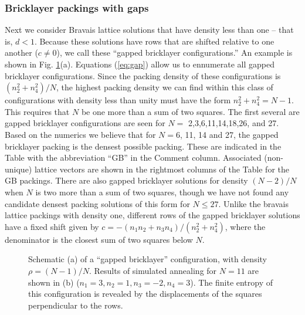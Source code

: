 \documentclass[aps]{revtex4}
\begin{document}
\subsubsection{Bricklayer packings with gaps}
\label{sec:bricklayer}
Next we consider Bravais lattice solutions that have density less than one -- that is, $d < 1$.  Because these solutions have rows that are shifted relative to one another ($c\neq 0$), we call these ``gapped bricklayer configurations.''  An example is shown in Fig. \ref{fig:gb}(a).  Equations (\ref{eq:gap}) allow us to ennumerate all gapped bricklayer configurations. Since the packing density of these configurations is $(n_2^2 + n_4^2)/N$, the highest packing density we can find within this class of configurations with density less than unity must have the form $n_2^2 + n_4^2 = N-1$.  This requires that $N$ be one more than a sum of two squares. The first several are gapped bricklayer configurations are seen for $N=$ 2,3,6,11,14,18,26, and 27.  Based on the numerics we believe that for $N=6$, 11, 14 and 27, the gapped bricklayer packing is the densest possible packing. These are indicated in the Table with the abbreviation ``GB'' in the Comment column. Associated (non-unique) lattice vectors are shown in the rightmost columns of the Table for the GB packings.  There are also gapped bricklayer solutions for density $(N-2)/N$ when $N$ is two more than a sum of two squares, though we have not found any candidate densest packing solutions of this form for $N \leq 27$. Unlike the bravais lattice packings with density one, different rows of the gapped bricklayer solutions have a fixed shift given by $c = - (n_1 n_2 + n_3 n_4)/(n_2^2 + n_4^2)$, where the denominator is the closest sum of two squares below $N$. 

\begin{figure}[H]
\caption{\label{fig:gb}Schematic (a) of a ``gapped bricklayer'' configuration, with density $\rho = (N-1)/N$. Results of simulated annealing for $N=11$ are shown in (b) ($n_1=3, n_2=1, n_3=-2, n_4=3$).  The finite entropy of this configuration is revealed by the displacements of the squares perpendicular to the rows.}
\end{figure}
\end{document}
